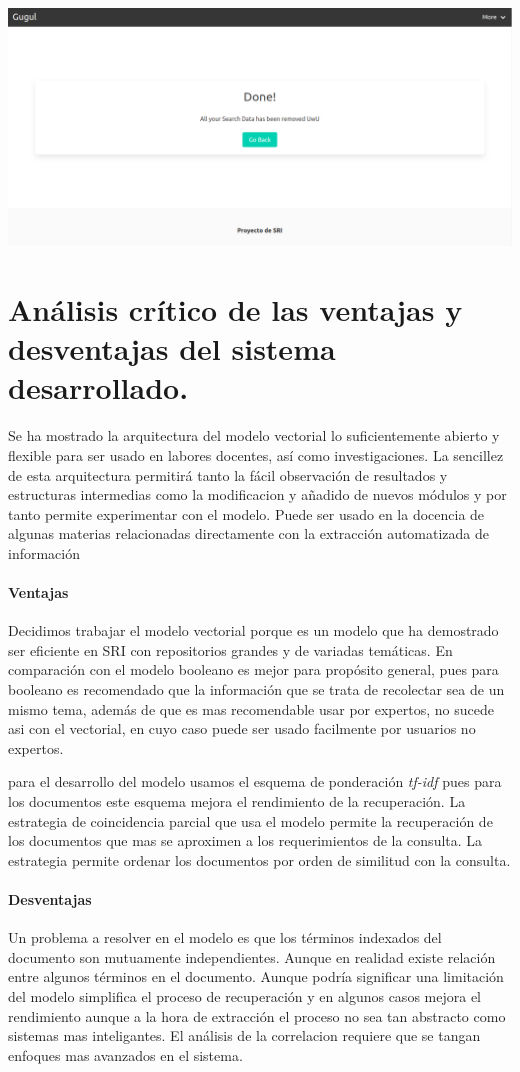 \documentclass{llncs}
\begin{document}
\begin{center}
	\includegraphics[width=0.5\linewidth]{img/clear.png} 
\end{center}

\section{An\'alisis cr\'itico de las ventajas y desventajas del sistema desarrollado.}


Se ha mostrado la arquitectura del modelo vectorial lo suficientemente abierto y flexible para ser usado en labores docentes, as\'i como investigaciones. La sencillez de esta arquitectura permitir\'a tanto la f\'acil observaci\'on de resultados y estructuras intermedias como la modificacion y a\~nadido de nuevos m\'odulos y por tanto permite experimentar con el modelo. Puede ser usado en la docencia de algunas materias relacionadas directamente con la extracci\'on automatizada de informaci\'on  


\paragraph{Ventajas}
Decidimos trabajar el modelo vectorial porque es un modelo que ha demostrado ser eficiente en SRI con repositorios grandes y de variadas tem\'aticas. En comparaci\'on con el modelo booleano es mejor para prop\'osito general, pues para booleano es recomendado que la informaci\'on que se trata de recolectar sea de un mismo tema, adem\'as de que es mas recomendable usar por expertos, no sucede asi con el vectorial, en cuyo caso puede ser usado facilmente por usuarios no expertos.

para el desarrollo del modelo usamos el esquema de ponderaci\'on \textit{tf-idf} pues para los documentos este esquema mejora el rendimiento de la recuperaci\'on. La estrategia de coincidencia parcial que usa el modelo permite la recuperaci\'on de los documentos que mas se aproximen a los requerimientos de la consulta. La estrategia permite ordenar los documentos por orden de similitud con la consulta.

\paragraph{Desventajas}
Un problema a resolver en el modelo es que  los t\'erminos indexados del documento son mutuamente independientes. Aunque en realidad existe relaci\'on entre algunos t\'erminos en el documento. Aunque podr\'ia significar una limitaci\'on del modelo simplifica el proceso de recuperaci\'on y en algunos casos mejora el rendimiento aunque a la hora de extracci\'on el proceso no sea tan abstracto como sistemas mas inteligantes. El an\'alisis de la correlacion requiere que se tangan enfoques mas avanzados en el sistema.
\end{document}
